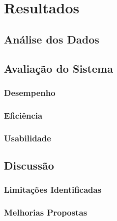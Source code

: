 

\chapter{Resultados}
\label{cap:resultados}

\section{Análise dos Dados}

\section{Avaliação do Sistema}
\subsection{Desempenho}
\subsection{Eficiência}
\subsection{Usabilidade}

\section{Discussão}
\subsection{Limitações Identificadas}
\subsection{Melhorias Propostas}